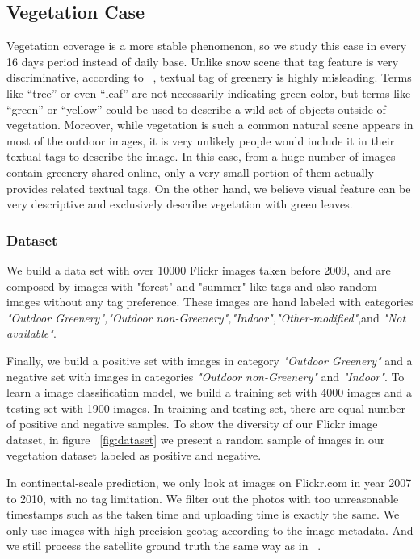 \subsection{Vegetation Case}
Vegetation coverage is a more stable phenomenon, so we study this case in every 16 days period instead of daily base.
Unlike snow scene that 
tag feature is very discriminative, according 
to ~\cite{ecology2012www}, textual tag of greenery is highly misleading. 
Terms like ``tree'' or even ``leaf'' are not necessarily 
indicating green color, but terms like ``green'' or 
``yellow'' could be used to describe a wild set of objects outside of vegetation. Moreover, while vegetation is 
such a common natural scene appears in most of the outdoor images, it is very unlikely people would include it in their textual tags 
to describe the image. In this case, from a huge number of images contain greenery shared online, only a very small portion of them 
actually provides related textual tags. On the other hand, we believe visual feature can be very descriptive and exclusively 
describe vegetation with green leaves.



\subsubsection{Dataset}
We build a data set with over 10000 Flickr images taken before 2009, and are composed by images with "forest" and "summer" like tags 
and also random images without any tag preference. These images are hand labeled with categories 
\textit{"Outdoor Greenery","Outdoor non-Greenery","Indoor","Other-modified"},and \textit{"Not available"}.

Finally, we build a positive set with images in category \textit{"Outdoor Greenery"} and a negative set 
with images in categories \textit{"Outdoor non-Greenery"} and \textit{"Indoor"}. To learn a image classification model, 
we build a training set with 4000 images and a testing set with 1900 images. 
In training and testing set, there are equal number of positive and negative samples.
To show the diversity of our Flickr image dataset, in figure ~\ref{fig:dataset}
we present a random sample of images in our vegetation dataset labeled as positive and negative.

In continental-scale prediction, we only look at images on Flickr.com in year 2007 to 2010, with no tag limitation. 
We filter out the photos with too unreasonable timestamps such as the taken time and uploading time is exactly the same.
We only use images with high precision geotag according to the image metadata. And we still process the 
satellite ground truth the same way as in ~\cite{ecology2012www}.



